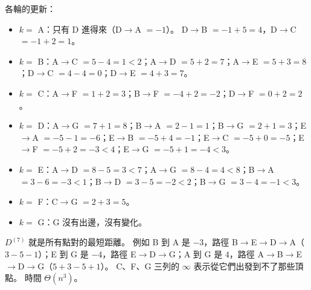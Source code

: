 \begin{pastsoln}
各輪的更新：
\begin{itemize}
\item $k = $ A：只有 D 進得來（D$\to$A $= -1$）。 D$\to$B $= -1 + 5 = 4$，D$\to$C $= -1 + 2 = 1$。
\item $k = $ B：A$\to$C $= 5 - 4 = 1 < 2$；A$\to$D $= 5 + 2 = 7$；A$\to$E $= 5 + 3 = 8$；D$\to$C
$= 4 - 4 = 0$；D$\to$E $= 4 + 3 = 7$。
\item $k = $ C：A$\to$F $= 1 + 2 = 3$；B$\to$F $= -4 + 2 = -2$；D$\to$F $= 0 + 2 = 2$。
\item $k = $ D：A$\to$G $= 7 + 1 = 8$；B$\to$A $= 2 - 1 = 1$；B$\to$G $= 2 + 1 = 3$；E$\to$A $= -5 - 1
= -6$；E$\to$B $= -5 + 4 = -1$；E$\to$C $= -5 + 0 = -5$；E$\to$F $= -5 + 2 = -3 < 4$；E$\to$G
$= -5 + 1 = -4 < 3$。
\item $k = $ E：A$\to$D $= 8 - 5 = 3 < 7$；A$\to$G $= 8 - 4 = 4 < 8$；B$\to$A $= 3 - 6 = -3 < 1$；B$\to$D
$= 3 - 5 = -2 < 2$；B$\to$G $= 3 - 4 = -1 < 3$。
\item $k = $ F：C$\to$G $= 2 + 3 = 5$。
\item $k = $ G：G 沒有出邊，沒有變化。
\end{itemize}
$D^{(7)}$ 就是所有點對的最短距離。 例如 B 到 A 是 $-3$，路徑 B$\to$E$\to$D$\to$A（$3 - 5 - 1$）；E 到 G
是 $-4$，路徑 E$\to$D$\to$G；A 到 G 是 $4$，路徑 A$\to$B$\to$E$\to$D$\to$G（$5 + 3 - 5 + 1$）。 C、F、G
三列的 $\infty$ 表示從它們出發到不了那些頂點。 時間 $\Theta(n^3)$。
\end{pastsoln}
